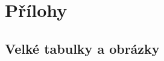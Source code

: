 \documentclass[FM,BP]{tulthesis}
\begin{document}
\printbibliography[title={Použitá literatura},heading=bibintoc] %



\renewcommand{\indexname}{Rejstřík}
\printindex

\appendix
\chapter{Přílohy}

\section{Velké tabulky a obrázky} %
\end{document}
